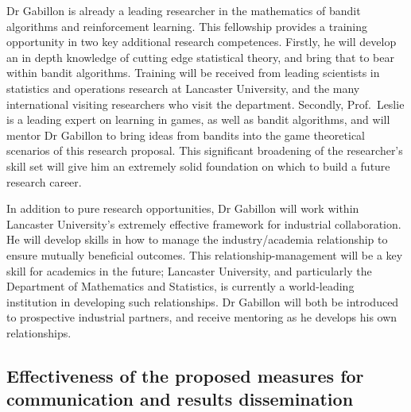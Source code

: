 \documentclass[a4paper,11pt]{article}
\begin{document}
Dr Gabillon is already a leading researcher in the mathematics of bandit algorithms and reinforcement learning.  This fellowship provides a training opportunity in two key additional research competences.  Firstly, he will develop an in depth knowledge of cutting edge statistical theory, and bring that to bear within bandit algorithms.  Training will be received from leading scientists in statistics and operations research at Lancaster University, and the many international visiting researchers who visit the department.   Secondly, Prof.\ Leslie is a leading expert on learning in games, as well as bandit algorithms, and will mentor Dr Gabillon to bring ideas from bandits into the game theoretical scenarios of this research proposal.  This significant broadening of the researcher's skill set will give him an extremely solid foundation on which to build a future research career.

In addition to pure research opportunities, Dr Gabillon will work within Lancaster University's extremely effective framework for industrial collaboration.  He will develop skills in how to manage the industry/academia relationship to ensure mutually beneficial outcomes.  This relationship-management will be a key skill for academics in the future; Lancaster University, and particularly the Department of Mathematics and Statistics, is currently a world-leading institution in developing such relationships.  Dr Gabillon will both be introduced to prospective industrial partners, and receive mentoring as he develops his own relationships.


\subsection{Effectiveness of the proposed measures for communication and results dissemination}
\end{document}
